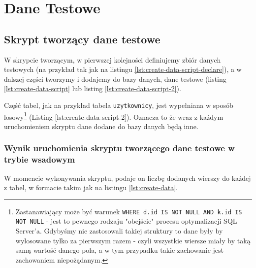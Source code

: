 \section{Dane Testowe}

\subsection{Skrypt tworzący dane testowe}

W skrypcie tworzącym, w pierwszej kolejności definiujemy zbiór danych testowych (na przykład tak jak na listingu \ref{lst:create-data-script-declare}), a w dalszej części tworzymy i dodajemy do bazy danych, dane testowe (listing \ref{lst:create-data-script} lub listing \ref{lst:create-data-script-2}).

Część tabel, jak na przykład tabela \texttt{uzytkownicy}, jest wypełniana w sposób losowy\footnote{Zastanawiający może być warunek \texttt{WHERE d.id IS NOT NULL AND k.id IS NOT NULL} - jest to pewnego rodzaju "obejście" procesu optymalizacji SQL Server'a. Gdybyśmy nie zastosowali takiej struktury to dane były by wylosowane tylko za pierwszym razem - czyli wszystkie wiersze miały by taką samą wartość danego pola, a w tym przypadku takie zachowanie jest zachowaniem niepożądanym.} (Listing \ref{lst:create-data-script-2}). Oznacza to że wraz z każdym uruchomieniem skryptu dane dodane do bazy danych będą inne.







\subsubsection{Wynik uruchomienia skryptu tworzącego dane testowe w trybie wsadowym}

W momencie wykonywania skryptu, podaje on liczbę dodanych wierszy do każdej z tabel, w formacie takim jak na listingu \ref{lst:create-data}.

